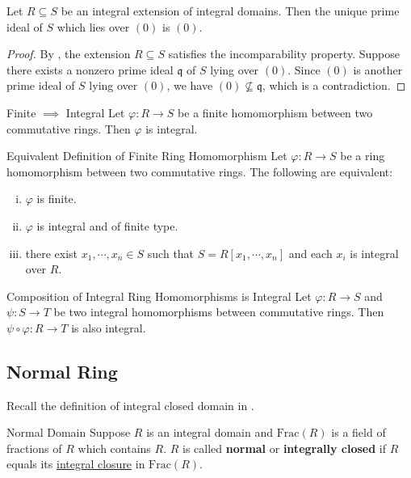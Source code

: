 \begin{corollary}{}{}
    Let $R\subseteq S$ be an integral extension of integral domains. Then the unique prime ideal of $S$ which lies over $(0)$ is $(0)$.
\end{corollary}
\begin{proof}
    By , the extension $R\subseteq S$ satisfies the incomparability property. Suppose there exists a nonzero prime ideal $\mathfrak{q}$ of $S$ lying over $(0)$. Since $(0)$ is another prime ideal of $S$ lying over $(0)$, we have $(0)\not\subseteq \mathfrak{q}$, which is a contradiction.
\end{proof}




\begin{lemma}{Finite $\implies$ Integral}{}
    Let $\varphi:R\to S$ be a finite homomorphism between two commutative rings. Then $\varphi$ is integral.
\end{lemma}

\begin{proposition}{Equivalent Definition of Finite Ring Homomorphism}{}
    Let $\varphi:R\to S$ be a ring homomorphism between two commutative rings. The following are equivalent:
    \begin{enumerate}[(i)]
        \item $\varphi$ is finite.
        \item $\varphi$ is integral and of finite type.
        \item there exist $x_1,\cdots ,x_n\in S$ such that $S=R[x_1,\cdots ,x_n]$ and each $x_i$ is integral over $R$.
    \end{enumerate}
\end{proposition}


\begin{proposition}{Composition of Integral Ring Homomorphisms is Integral}{}
    Let $\varphi:R\to S$ and $\psi:S\to T$ be two integral homomorphisms between commutative rings. Then $\psi\circ\varphi:R\to T$ is also integral.
\end{proposition}

\subsection{Normal Ring}

Recall the definition of integral closed domain in .
\begin{definition}{Normal Domain}{}
    Suppose $R$ is an integral domain and $\mathrm{Frac}(R)$ is a field of fractions of $R$ which contains $R$. $R$ is called \textbf{normal} or \textbf{integrally closed} if $R$ equals its \hyperref[th:integral_closure]{integral closure} in $\mathrm{Frac}(R)$.
\end{definition}

